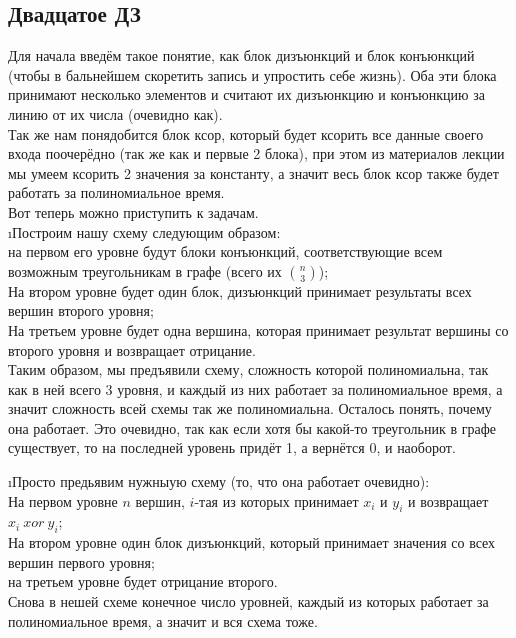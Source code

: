 \subsection{Двадцатое ДЗ}

Для начала введём такое понятие, как блок дизъюнкций и блок конъюнкций (чтобы в бальнейшем скоретить запись и упростить себе жизнь). Оба эти блока принимают несколько элементов и считают их дизъюнкцию и конъюнкцию за линию от их числа (очевидно как).\\
Так же нам понядобится блок ксор, который будет ксорить все данные своего входа поочерёдно (так же как и первые 2 блока), при этом из материалов лекции мы умеем ксорить 2 значения за константу, а значит весь блок ксор также будет работать за полиномиальное время.\\ 
Вот теперь можно приступить к задачам.\\


\i Построим нашу схему следующим образом:\\
на первом его уровне будут блоки конъюнкций, соответствующие всем возможным треугольникам в графе (всего их $\binom{n}{3}$);\\
На втором уровне будет один блок, дизъюнкций принимает результаты всех вершин второго уровня;\\
На третьем уровне будет одна вершина, которая принимает результат вершины со второго уровня и возвращает отрицание.\\
Таким образом, мы предъявили схему, сложность которой полиномиальна, так как в ней всего 3 уровня, и каждый из них работает за полиномиальное время, а значит сложность всей схемы так же полиномиальна. Осталось понять, почему она работает. Это очевидно, так как если хотя бы какой-то треугольник в графе существует, то на последней уровень придёт 1, а вернётся 0, и наоборот.

\i Просто предьявим нужныую схему (то, что она работает очевидно):\\
На первом уровне $n$ вершин, $i$-тая из которых принимает $x_i$ и $y_i$ и возвращает $x_i\ xor\ y_i$;\\
На втором уровне один блок дизъюнкций, который принимает значения со всех вершин первого уровня;\\
на третьем уровне будет отрицание второго.\\
Снова в нешей схеме конечное число уровней, каждый из которых работает за полиномиальное время, а значит и вся схема тоже.

